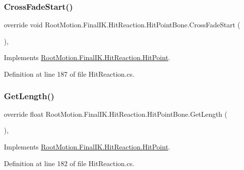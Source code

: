 \subsubsection{\texorpdfstring{Cross\+Fade\+Start()}{CrossFadeStart()}}
{\footnotesize\ttfamily override void Root\+Motion.\+Final\+I\+K.\+Hit\+Reaction.\+Hit\+Point\+Bone.\+Cross\+Fade\+Start (\begin{DoxyParamCaption}{ }\end{DoxyParamCaption})\hspace{0.3cm}{\ttfamily [protected]}, {\ttfamily [virtual]}}



Implements \mbox{\hyperlink{class_root_motion_1_1_final_i_k_1_1_hit_reaction_1_1_hit_point_a56804073dd02e8bf4988b1cb9f7bfaa7}{Root\+Motion.\+Final\+I\+K.\+Hit\+Reaction.\+Hit\+Point}}.



Definition at line 187 of file Hit\+Reaction.\+cs.

\mbox{\label{class_root_motion_1_1_final_i_k_1_1_hit_reaction_1_1_hit_point_bone_acc4a766ebf59fa88c1fadba20d014ca9}} 
\subsubsection{\texorpdfstring{Get\+Length()}{GetLength()}}
{\footnotesize\ttfamily override float Root\+Motion.\+Final\+I\+K.\+Hit\+Reaction.\+Hit\+Point\+Bone.\+Get\+Length (\begin{DoxyParamCaption}{ }\end{DoxyParamCaption})\hspace{0.3cm}{\ttfamily [protected]}, {\ttfamily [virtual]}}



Implements \mbox{\hyperlink{class_root_motion_1_1_final_i_k_1_1_hit_reaction_1_1_hit_point_a0d4fe08e2d170bf5c994c5387cd6823c}{Root\+Motion.\+Final\+I\+K.\+Hit\+Reaction.\+Hit\+Point}}.



Definition at line 182 of file Hit\+Reaction.\+cs.

